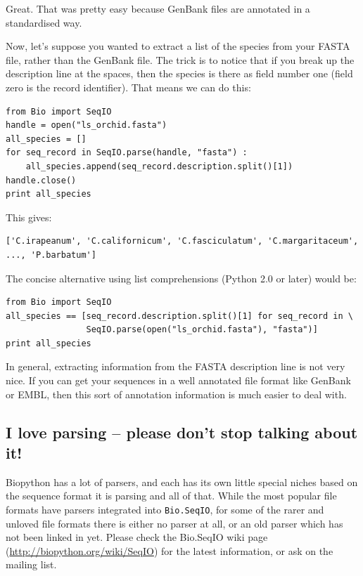 \documentclass{report}
\begin{document}
Great.  That was pretty easy because GenBank files are annotated in a standardised way.

Now, let's suppose you wanted to extract a list of the species from your FASTA file, rather than the GenBank file.  The trick is to notice that if you break up the description line at the spaces, then the species is there as field number one (field zero is the record identifier).  That means we can do this:

\begin{verbatim}
from Bio import SeqIO
handle = open("ls_orchid.fasta")
all_species = []
for seq_record in SeqIO.parse(handle, "fasta") :
    all_species.append(seq_record.description.split()[1])
handle.close()
print all_species
\end{verbatim}

\noindent This gives:

\begin{verbatim}
['C.irapeanum', 'C.californicum', 'C.fasciculatum', 'C.margaritaceum', ..., 'P.barbatum']
\end{verbatim}

The concise alternative using list comprehensions (Python 2.0 or later) would be:

\begin{verbatim}
from Bio import SeqIO
all_species == [seq_record.description.split()[1] for seq_record in \
                SeqIO.parse(open("ls_orchid.fasta"), "fasta")]
print all_species
\end{verbatim}

In general, extracting information from the FASTA description line is not very nice.  If you can get your sequences in a well annotated file format like GenBank or EMBL, then this sort of annotation information is much easier to deal with.

\subsection{I love parsing -- please don't stop talking about it!}

Biopython has a lot of parsers, and each has its own little special niches based on the sequence format it is parsing and all of that.  While the most popular file formats have parsers integrated into \verb|Bio.SeqIO|, for some of the rarer and unloved file formats there is either no parser at all, or an old parser which has not been linked in yet.  Please check the Bio.SeqIO wiki page (\url{http://biopython.org/wiki/SeqIO}) for the latest information, or ask on the mailing list.
\end{document}
